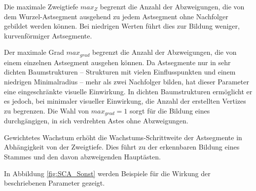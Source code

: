 Die maximale Zweigtiefe $max_Z$ begrenzt die Anzahl der Abzweigungen, die von dem Wurzel-Astsegment ausgehend zu jedem Astsegment ohne Nachfolger gebildet werden können. Bei niedrigen Werten führt dies zur Bildung weniger, kurvenförmiger Astsegmente.

Der maximale Grad $max_{grad}$ begrenzt die Anzahl der Abzweigungen, die von einem einzelnen Astsegment ausgehen können. Da Astsegmente nur in sehr dichten Baumstrukturen -- Strukturen mit vielen Einflusspunkten und einem niedrigen Minimalradius -- mehr als zwei Nachfolger bilden, hat dieser Parameter eine eingeschränkte visuelle Einwirkung. In dichten Baumstrukturen ermöglicht er es jedoch, bei minimaler visueller Einwirkung, die Anzahl der erstellten Vertizes zu begrenzen. Die Wahl von $max_{grad} = 1$ sorgt für die Bildung eines durchgängigen, in sich verdrehten Astes ohne Abzweigungen.

Gewichtetes Wachstum erhöht die Wachstums-Schrittweite der Astsegmente in Abhängigkeit von der Zweigtiefe. Dies führt zu der erkennbaren Bildung eines Stammes und den davon abzweigenden Hauptästen.

In Abbildung \ref{fig:SCA_Sonst} werden Beispiele für die Wirkung der beschriebenen Parameter gezeigt.

